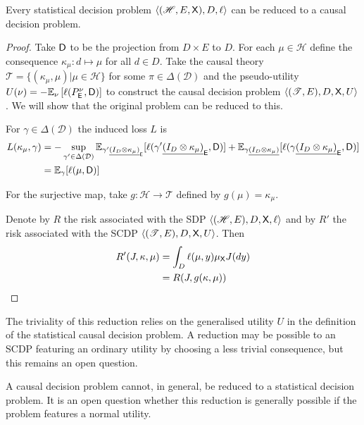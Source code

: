 \begin{theorem}\label{th:sdp_to_cdp}
Every statistical decision problem $\langle (\mathscr{H},E,\mathsf{X}),D,\ell\rangle$ can be reduced to a causal decision problem.
\end{theorem}
\begin{proof}
Take $\mathsf{D}$ to be the projection from $D\times E$ to $D$. For each $\mu\in \mathscr{H}$ define the consequence $\kappa_\mu:d\mapsto \mu$ for all $d\in D$. Take the causal theory $\mathscr{T}=\{(\kappa_\mu,\mu)|\mu\in \mathscr{H}\}$ for some $\pi\in \Delta(\mathcal{D})$ and the pseudo-utility $U(\nu) = -\mathbb{E}_\nu \left[\ell(P^\nu_{\mathsf{E}},\mathsf{D})\right]$ to construct the causal decision problem $\langle (\mathscr{T},E),D,\mathsf{X},U\rangle$. We will show that the original problem can be reduced to this.

For $\gamma\in \Delta(\mathcal{D})$ the induced loss $L$ is
\begin{align}
    L(\kappa_\mu,\gamma) &= -\sup_{\gamma'\in \Delta(\mathcal{D})} \mathbb{E}_{\gamma' \underline{(I_D\otimes \kappa_\mu)}_{\mathsf{E}}}[\ell(\gamma'\underline{(I_D\otimes \kappa_\mu)}_{\mathsf{E}},\mathsf{D})] + \mathbb{E}_{\gamma \underline{(I_D\otimes \kappa_\mu)}}[\ell(\gamma \underline{(I_D\otimes \kappa_\mu)}_{\mathsf{E}},\mathsf{D})]\\
                     &= \mathbb{E}_{\gamma}[\ell(\mu,\mathsf{D})]
\end{align}

For the surjective map, take $g:\mathscr{H}\to \mathscr{T}$ defined by $g(\mu)=\kappa_\mu$.

Denote by $R$ the risk associated with the SDP $\langle (\mathscr{H},E),D,\mathsf{X},\ell\rangle$ and by $R'$ the risk associated with the SCDP $\langle (\mathscr{T},E),D,\mathsf{X},U\rangle$. Then
\begin{align}
    R'(J,\kappa,\mu) &= \int_D \ell(\mu, y) \mu_{\mathsf{X}} J(dy)\\
                   &=R(J,g(\kappa,\mu))
\end{align}
\end{proof}

The triviality of this reduction relies on the generalised utility $U$ in the definition of the statistical causal decision problem. A reduction may be possible to an SCDP featuring an ordinary utility by choosing a less trivial consequence, but this remains an open question.

A causal decision problem cannot, in general, be reduced to a statistical decision problem. It is an open question whether this reduction is generally possible if the problem features a normal utility.

